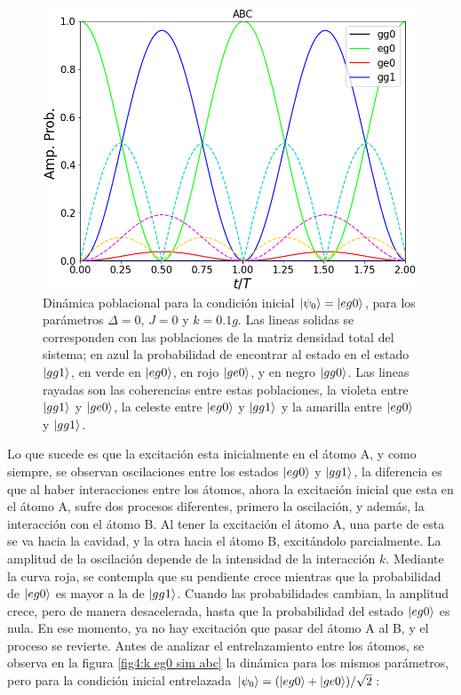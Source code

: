 \begin{figure}[h]
    \begin{minipage}[c]{0.67\textwidth}
        \includegraphics[width=\textwidth]{figuras/ch4/k eg0 ABC.png}
    \end{minipage}\hfill
    \begin{minipage}[c]{0.3\textwidth}
    \caption{Dinámica poblacional para la condición inicial $\ket{\psi_0}=\ket{eg0}$, para los parámetros $\Delta=0$, $J=0$ y $k=0.1g$. Las lineas solidas se corresponden con las poblaciones de la matriz densidad total del sistema; en azul la probabilidad de encontrar al estado en el estado $\ket{gg1}$, en verde en $\ket{eg0}$, en rojo $\ket{ge0}$, y en negro $\ket{gg0}$. Las lineas rayadas son las coherencias entre estas poblaciones, la violeta entre $\ket{gg1}$ y $\ket{ge0}$, la celeste entre $\ket{eg0}$ y $\ket{gg1}$ y la amarilla entre $\ket{eg0}$ y $\ket{gg1}$.
         } \label{fig4:k eg0 abc}
  \end{minipage}
\end{figure}
Lo que sucede es que la excitación esta inicialmente en el átomo A, y como siempre, se observan oscilaciones entre los estados $\ket{eg0}$ y $\ket{gg1}$, la diferencia es que al haber interacciones entre los átomos, ahora la excitación inicial que esta en el átomo A, sufre dos procesos diferentes, primero la oscilación, y además, la interacción con el átomo B. Al tener la excitación el átomo A, una parte de esta se va hacia la cavidad, y la otra hacia el átomo B, excitándolo parcialmente. La amplitud de la oscilación depende de la intensidad de la interacción $k$. Mediante la curva roja, se contempla que su pendiente crece mientras que la probabilidad de $\ket{eg0}$ es mayor a la de $\ket{gg1}$. Cuando las probabilidades cambian, la amplitud crece, pero de manera desacelerada, hasta que la probabilidad del estado $\ket{eg0}$ es nula. En ese momento, ya no hay excitación que pasar del átomo A al B, y el proceso se revierte. Antes de analizar el entrelazamiento entre los átomos, se observa en la figura \ref{fig4:k eg0 sim abc} la dinámica para los mismos parámetros, pero para la condición inicial entrelazada $\ket{\psi_0}=(\ket{eg0}+\ket{ge0})/\sqrt{2}$:
